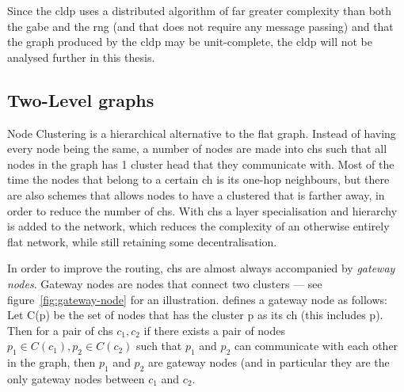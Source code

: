 Since the \ac{cldp} uses a distributed algorithm of far greater complexity than both the \ac{gabe} and the \ac{rng} (and that does not require any message passing) and that the graph produced by the \ac{cldp} may be unit-complete, the \ac{cldp} will not be analysed further in this thesis.

\subsection{Two-Level graphs}


\label{section:cluster_methods}
Node Clustering is a hierarchical alternative to the flat graph. Instead of having every node being the same, a number of nodes are made into \acp{ch} such that all nodes in the graph has 1 cluster head that they communicate with. Most of the time the nodes that belong to a certain \ac{ch} is its one-hop neighbours, but there are also schemes that allows nodes to have a clustered that is farther away, in order to reduce the number of \acp{ch}. With \acp{ch} a layer specialisation and hierarchy is added to the network, which reduces the complexity of an otherwise entirely flat network, while still retaining some decentralisation.

In order to improve the routing, \acp{ch} are almost always accompanied by \emph{gateway nodes}. Gateway nodes are nodes that connect two clusters --- see figure~\ref{fig:gateway-node} for an illustration. \cite{spanners} defines a gateway node as follows:
Let C(p) be the set of nodes that has the cluster p as its \ac{ch} (this includes p). Then for a pair of \acp{ch} $c_1, c_2$ if there exists a pair of nodes $p_1 \in C(c_1), p_2 \in C(c_2)$ such that $p_1$ and $p_2$ can communicate with each other in the graph, then $p_1$ and $p_2$ are gateway nodes (and in particular they are the only gateway nodes between $c_1$ and $c_2$.  

